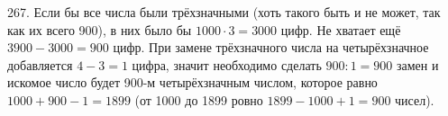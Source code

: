 267. Если бы все числа были трёхзначными (хоть такого быть и не может, так как их всего 900), в них было бы $1000\cdot3=3000$ цифр. Не хватает ещё $3900-3000=900$ цифр. При замене трёхзначного числа на четырёхзначное добавляется $4-3=1$ цифра, значит необходимо сделать $900:1=900$ замен и искомое число будет 900-м четырёхзначным числом, которое равно $1000+900-1=1899$ (от 1000 до 1899 ровно $1899-1000+1=900$ чисел).\\
